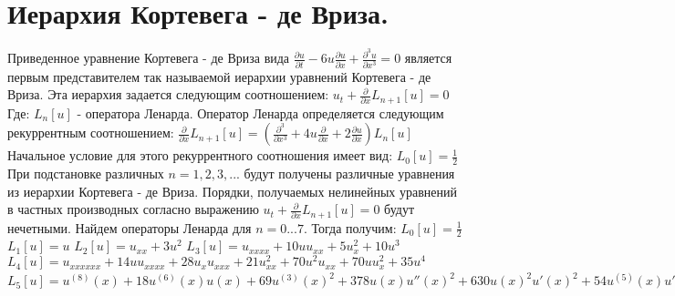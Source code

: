 \documentclass[14pt,a4paper]{article}
\begin{document}
\section{Иерархия Кортевега - де Вриза.}
Приведенное уравнение Кортевега - де Вриза вида $\frac{\partial u}{\partial t} - 6u \frac{\partial u}{\partial x} + \frac{\partial^3 u}{\partial x^3} = 0$ является первым представителем так называемой иерархии уравнений Кортевега - де Вриза. \newline
Эта иерархия задается следующим соотношением: \newline
$u_t + \frac{\partial}{\partial x} L_{n + 1} [u] = 0$
\newline
Где: \newline
$L_{n} [u]$ - оператора Ленарда. \newline
Оператор Ленарда определяется следующим рекуррентным соотношением: \newline
$
\frac{\partial}{\partial x} L_{n + 1} [u] = (\frac{\partial^3}{\partial x^3} + 4 u \frac{\partial}{\partial x} + 2 \frac{\partial u}{\partial x}) L_{n} [u]
$
\newline
Начальное условие для этого рекуррентного соотношения имеет вид: \newline
$L_0 [u] = \frac{1}{2}$
\newline
При подстановке различных $n = 1, 2, 3, ...$ будут получены различные уравнения из иерархии Кортевега - де Вриза. \newline
Порядки, получаемых нелинейных уравнений в частных производных согласно выражению $u_t + \frac{\partial}{\partial x} L_{n + 1} [u] = 0$ будут нечетными.
\newline
Найдем операторы Ленарда для $n = 0...7$.\newline
Тогда получим: \newline
$L_0 [u] = \frac{1}{2}$
\newline
$L_1 [u] = u$
\newline
$L_2 [u] = u_{xx} + 3 u^2$
\newline
$L_3 [u] = u_{xxxx} + 10uu_{xx} + 5 u_{x}^{2} + 10 u^3$
\newline
$L_4 [u] = u_{xxxxxx} + 14uu_{xxxx} + 28u_{x}u_{xxx} + 21u_{xx}^{2} + 70 u^2 u_{xx} + 70 u u_{x}^{2} + 35 u^4$
\newline
$L_5 [u] = u^{(8)}(x)+18 u^{(6)}(x) u(x)+69 u^{(3)}(x)^2+378 u(x) u''(x)^2+630 u(x)^2 u'(x)^2+54 u^{(5)}(x) u'(x)+6 u^{(4)}(x)(19 u''(x)+21 u(x)^2)+504 u^{(3)}(x) u(x) u'(x)+42(11 u'(x)^2+10 u(x)^3)u''(x)+126 u(x)^5$
\end{document}
